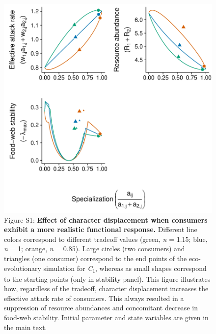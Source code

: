 \documentclass[11pt,]{article}
\begin{document}
\begin{figure}
\centering
\includegraphics{Figure_ECD_McCann.pdf}
\caption{Figure S1: \textbf{Effect of character displacement when
consumers exhibit a more realistic functional response.} Different line
colors correspond to different tradeoff values (green, \emph{n} = 1.15;
blue, \emph{n} = 1; orange, \emph{n} = 0.85). Large circles (two
consumers) and triangles (one consumer) correspond to the end points of
the eco-evolutionary simulation for \emph{C}\textsubscript{1}, whereas
as small shapes correspond to the starting points (only in stability
panel). This figure illustrates how, regardless of the tradeoff,
character displacement increases the effective attack rate of consumers.
This always resulted in a suppression of resource abundances and
concomitant decrease in food-web stability. Initial parameter and state
variables are given in the main text.}
\end{figure}

\newpage 
\end{document}
